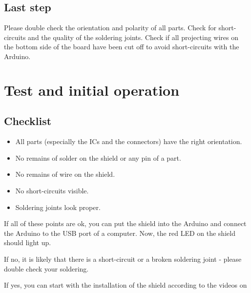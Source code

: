 \documentclass[fleqn,10pt]{SelfArx} %
\begin{document}


\subsection*{Last step}

Please double check the orientation and polarity of all parts. Check for short-circuits and the quality of the soldering joints. Check if all projecting wires on the bottom side of the board have been cut off to avoid short-circuits with the Arduino.


\section{Test and initial operation}

\subsection*{Checklist}

\begin{itemize}[noitemsep] %
\item[\CheckedBox] All parts (especially the ICs and the connectors) have the right orientation.
\item[\CheckedBox] No remains of solder on the shield or any pin of a part.
\item[\CheckedBox] No remains of wire on the shield.
\item[\CheckedBox] No short-circuits visible.
\item[\CheckedBox] Soldering joints look proper.
\end{itemize}

If all of these points are ok, you can put the shield into the Arduino and connect the Arduino to the USB port of a computer. Now, the red LED on the shield should light up.

If no, it is likely that there is a short-circuit or a broken soldering joint - please double check your soldering.

If yes, you can start with the installation of the shield according to the videos on
\end{document}
